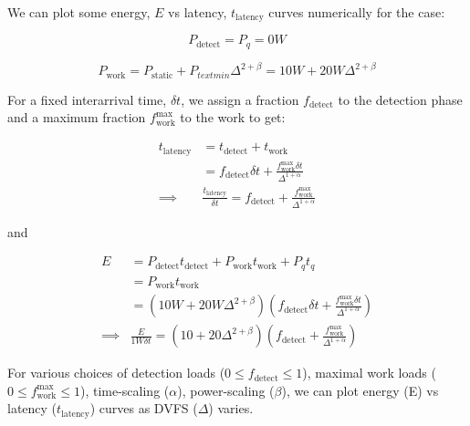 We can plot some energy, $E$ vs latency, $t_{\text{latency}}$ curves numerically for the case:

$$P_{\text{detect}} = P_q = 0W$$

$$P_{\text{work}} = P_{\text{static}} + P_{text{min}} \Delta^{2+\beta} = 10W + 20W \Delta^{2+\beta}$$

For a fixed interarrival time, $\delta t$, we assign a fraction $f_{\text{detect}}$ to the detection phase and a maximum fraction $f_{\text{work}}^{\text{max}}$ to the work to get:

\begin{equation}
\begin{split}
    t_{\text{latency}} &= t_{\text{detect}} + t_{\text{work}} \\
    &= f_{\text{detect}}\delta t + \frac{f_{\text{work}}^{\text{max}}\delta t}{\Delta^{1+\alpha}}  \\
\implies & \boxed{\frac{t_{\text{latency}}}{\delta t} = f_{\text{detect}} + \frac{f_{\text{work}}^{\text{max}}}{\Delta^{1+\alpha}}}
\end{split}
\end{equation}

and

\begin{equation}
\begin{split}
    E &= P_\text{detect} t_{\text{detect}} + P_{\text{work}}  t_{\text{work}} + P_q t_q \\
    &= P_{\text{work}}  t_{\text{work}} \\
    &= (10W + 20W \Delta^{2+\beta}) (f_{\text{detect}}\delta t + \frac{f_{\text{work}}^{\text{max}}\delta t}{\Delta^{1+\alpha}}) \\
    \implies &\boxed{\frac{E}{1W \delta t} = (10 + 20 \Delta^{2+\beta})(f_{\text{detect}} + \frac{f_{\text{work}}^{\text{max}}}{\Delta^{1+\alpha}})}
\end{split}
\end{equation}

For various choices of detection loads ($0 \leq f_{\text{detect}} \leq 1$), maximal work loads ($0 \leq f_{\text{work}}^{\text{max}} \leq 1$), time-scaling ($\alpha$), power-scaling ($\beta$), we can plot energy (E) vs latency ($t_{\text{latency}}$) curves as DVFS ($\Delta$) varies.

